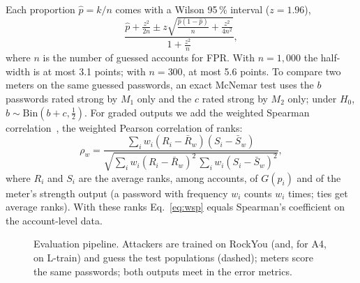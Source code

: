 \documentclass[conference]{IEEEtran}
\begin{document}
Each proportion $\hat p=k/n$ comes with a Wilson 95\,\% interval ($z=1.96$),
\begin{equation}\label{eq:wilson}
\frac{\hat p+\frac{z^2}{2n}\pm z\sqrt{\frac{\hat p(1-\hat p)}{n}+\frac{z^2}{4n^2}}}{1+\frac{z^2}{n}},
\end{equation}
where $n$ is the number of guessed accounts for FPR. With $n=1{,}000$ the half-width is at most 3.1 points; with $n=300$, at most 5.6 points. To compare two meters on the same guessed passwords, an exact McNemar test uses the $b$ passwords rated strong by $M_1$ only and the $c$ rated strong by $M_2$ only; under $H_0$, $b\sim\mathrm{Bin}(b+c,\tfrac12)$. For graded outputs we add the weighted Spearman correlation~\cite{golla2018}, the weighted Pearson correlation of ranks:
\begin{equation}\label{eq:wsp}
\rho_w=\frac{\sum_i w_i(R_i-\bar R_w)(S_i-\bar S_w)}{\sqrt{\sum_i w_i(R_i-\bar R_w)^2\,\sum_i w_i(S_i-\bar S_w)^2}},
\end{equation}
where $R_i$ and $S_i$ are the average ranks, among accounts, of $G(p_i)$ and of the meter's strength output (a password with frequency $w_i$ counts $w_i$ times; ties get average ranks). With these ranks Eq.~\eqref{eq:wsp} equals Spearman's coefficient on the account-level data.

\begin{figure}[t]
\centering
{}
\caption{Evaluation pipeline. Attackers are trained on RockYou (and, for A4, on L-train) and guess the test populations (dashed); meters score the same passwords; both outputs meet in the error metrics.}
\label{fig:pipeline}
\end{figure}
\end{document}

